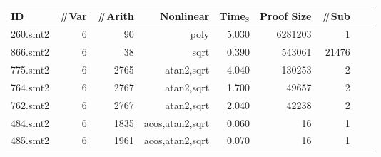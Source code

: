 \begin{table}
  \begin{center}
\begin{tabular}{|l||r|r|r||r|r|r|r|r|}
\hline
ID & \#Var & \#Arith & Nonlinear & Time$_{\text{S}}$ & Proof Size & \#Sub \\
\hline
\hline
260.smt2 & 6 & 90 &  poly & 5.030 & 6281203 & 1 \\
\hline
866.smt2 & 6 & 38 & sqrt & 0.390 & 543061 & 21476 \\
\hline
775.smt2 & 6 & 2765 & atan2,sqrt & 4.040 & 130253 & 2 \\
\hline
764.smt2 & 6 & 2767 & atan2,sqrt & 1.700 & 49657 & 2 \\
\hline
762.smt2 & 6 & 2767 & atan2,sqrt & 2.040 & 42238 & 2 \\
\hline
484.smt2 & 6 & 1835 & acos,atan2,sqrt & 0.060 & 16 & 1 \\
\hline
485.smt2 & 6 & 1961 & acos,atan2,sqrt & 0.070 & 16 & 1 \\

\end{tabular}
\end{center}
\end{table}
